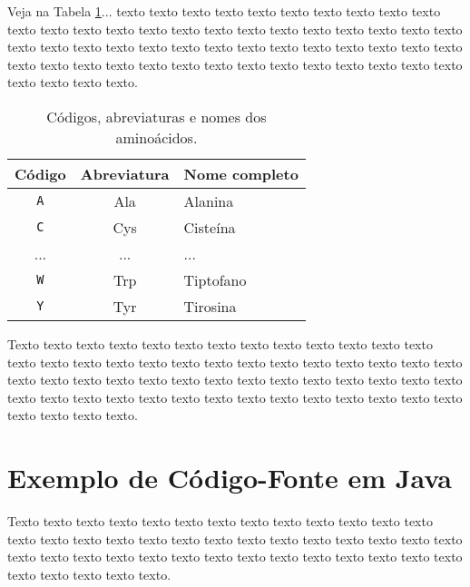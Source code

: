 Veja na Tabela \ref{tab:amino_acidos}...  texto texto texto texto texto texto
texto texto texto texto texto texto texto texto texto texto texto texto texto
texto texto texto texto texto texto texto texto texto texto texto texto texto
texto texto texto texto texto texto texto texto texto texto texto texto texto
texto texto texto texto texto texto texto texto texto texto texto.

\begin{table}[!t]
\begin{center}
    \begin{tabular}{c|c|l}
	 \hline
	 Código & Abreviatura & Nome completo \\ \hline
     \texttt{A} & Ala & Alanina \\
     \texttt{C} & Cys & Cisteína \\
     ...        & ... & ... \\
     \texttt{W} & Trp & Tiptofano \\
     \texttt{Y} & Tyr & Tirosina \\ \hline
    \end{tabular}
  \caption{Códigos, abreviaturas e nomes dos aminoácidos.}
  \label{tab:amino_acidos}
\end{center}
\end{table}

Texto texto texto texto texto texto texto texto texto texto texto texto texto
texto texto texto texto texto texto texto texto texto texto texto texto texto
texto texto texto texto texto texto texto texto texto texto texto texto texto
texto texto texto texto texto texto texto texto texto texto texto texto texto
texto texto texto texto texto texto texto.


\section{Exemplo de Código-Fonte em Java}
\label{sec:exemplo_codigo_fonte}
Texto texto texto texto texto texto texto texto texto texto texto texto texto
texto texto texto texto texto texto texto texto texto texto texto texto texto
texto texto texto texto texto texto texto texto texto texto texto texto texto
texto texto texto texto texto texto texto.


